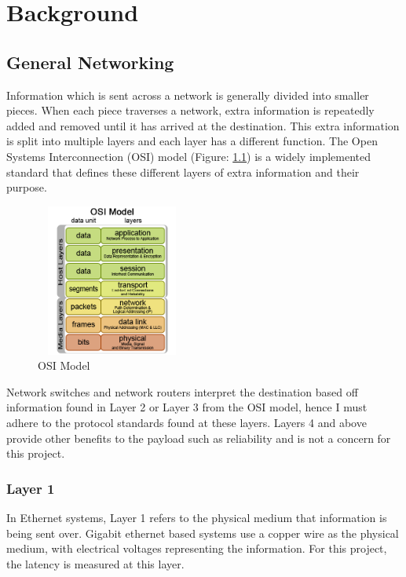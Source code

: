 \chapter{Background}\label{C:back}

\section{General Networking}

Information which is sent across a network is generally divided into smaller pieces. When each piece
traverses a network, extra information is repeatedly added and removed until it has arrived at the
destination. This extra information is split into multiple layers and each layer has a different function.
The Open Systems Interconnection (OSI) model (Figure: \ref{fig:OSIModel}) is a widely implemented standard that
defines these different layers of extra information and their purpose.

\begin{figure}[H]
    \begin{center}
        \includegraphics[width=5cm,height=5cm,keepaspectratio]{Images/OSIModel.png}
        \caption{OSI Model \cite{OSIPic}}
        \label{fig:OSIModel}
    \end{center}
\end{figure}

Network switches and network routers interpret the destination based off information found in
Layer 2 or Layer 3 from the OSI model, hence I must adhere to the protocol standards found at these
layers. Layers 4 and above provide other benefits to the payload such as reliability and is not a
concern for this project.

\subsection{Layer 1}

In Ethernet systems, Layer 1 refers to the physical medium that information is being sent over.
Gigabit ethernet based systems use a copper wire as the physical medium, with electrical voltages
representing the information. For this project, the latency is measured at this layer.

